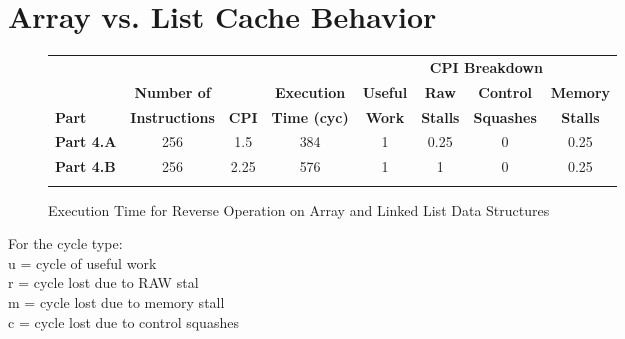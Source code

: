 \documentclass[10pt]{article}
\begin{document}
\cleardoublepage
\section{Array vs. List Cache Behavior}
\begin{figure}[H]
\centering
\begin{tabular}{@{\extracolsep{3pt}}lccccccc@{}}
\Xhline{2\arrayrulewidth}
& & & & \multicolumn{4}{c}{\textbf{CPI Breakdown}}\\
\cline{5-8}
& \textbf{Number of} & & \textbf{Execution} & \textbf{Useful} & \textbf{Raw} & \textbf{Control} & \textbf{Memory} \\
\textbf{Part} & \textbf{Instructions} & \textbf{CPI} & \textbf{Time (cyc)} & \textbf{Work} & \textbf{Stalls} & \textbf{Squashes} & \textbf{Stalls}\\
\hline
\textbf{Part 4.A} & 256 & 1.5 & 384 & 1 & 0.25 & 0 & 0.25\\
\hline
\textbf{Part 4.B} & 256 & 2.25 & 576 & 1 & 1 & 0 & 0.25\\
\Xhline{2\arrayrulewidth}
\end{tabular}
\caption{Execution Time for Reverse Operation on Array and Linked List Data Structures}
\end{figure}

For the cycle type:\\
u = cycle of useful work\\
r = cycle lost due to RAW stal\\
m = cycle lost due to memory stall\\
c = cycle lost due to control squashes\\
\end{document}
